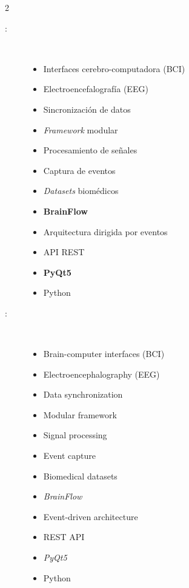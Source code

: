 \begin{multicols}{2}
\begin{description}
\item [\palabraschaveprincipal:] \mbox{} \\[-20pt]
  \begin{itemize}
    \item Interfaces cerebro-computadora (BCI)
    \item Electroencefalografía (EEG)
    \item Sincronización de datos
    \item \textit{Framework} modular
    \item Procesamiento de señales
    \item Captura de eventos
    \item \textit{Datasets} biomédicos
    \item \textbf{BrainFlow}
    \item Arquitectura dirigida por eventos
    \item API REST
    \item \textbf{PyQt5}
    \item Python
  \end{itemize}
\end{description}
\begin{description}
\item [\palabraschavesecundaria:] \mbox{} \\[-20pt]
  \begin{itemize}
    \item Brain-computer interfaces (BCI)
    \item Electroencephalography (EEG)
    \item Data synchronization
    \item Modular framework
    \item Signal processing
    \item Event capture
    \item Biomedical datasets
    \item \textit{BrainFlow}
    \item Event-driven architecture
    \item REST API
    \item \textit{PyQt5}
    \item Python
  \end{itemize}
\end{description}
\end{multicols}